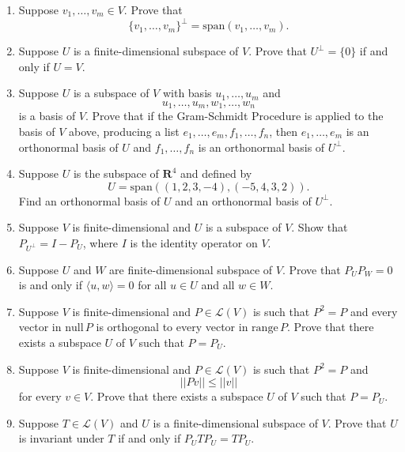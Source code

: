 \documentclass{book}
\begin{document}
\begin{enumerate}

\item Suppose \(v_1,\dots,v_m \in V\).  Prove that \[\{v_1,\dots,v_m\}^{\perp} = \textrm{span}(v_1,\dots,v_m).\]

\item Suppose \(U\) is a finite-dimensional subspace of \(V\).  Prove that \(U^{\perp}=\{0\}\) if and only if \(U=V\).

\item Suppose \(U\) is a subspace of \(V\) with basis \(u_1,\dots,u_m\) and \[u_1,\dots,u_m,w_1,\dots,w_n\] is a basis of \(V\).  Prove that if the Gram-Schmidt Procedure is applied to the basis of \(V\) above, producing a list \(e_1,\dots,e_m,f_1,\dots,f_n\), then \(e_1,\dots,e_m\) is an orthonormal basis of \(U\) and \(f_1,\dots,f_n\) is an orthonormal basis of \(U^{\perp}\).

\item Suppose \(U\) is the subspace of \(\textbf{R}^4\) and defined by \[U=\textrm{span}((1,2,3,-4),(-5,4,3,2)).\] Find an orthonormal basis of \(U\) and an orthonormal basis of \(U^{\perp}\).

\item Suppose \(V\) is finite-dimensional and \(U\) is a subspace of \(V\).  Show that \(P_{U^{\perp}}=I-P_U\), where \(I\) is the identity operator on \(V\).

\item Suppose \(U\) and \(W\) are finite-dimensional subspace of \(V\).  Prove that \(P_UP_W=0\) is and only if \(\langle u,w \rangle=0\) for all \(u \in U\) and all \(w \in W\).

\item Suppose \(V\) is finite-dimensional and \(P \in \mathcal{L}(V)\) is such that \(P^2=P\) and every vector in \(\textrm{null} \, P\) is orthogonal to every vector in \(\textrm{range} \, P\).  Prove that there exists a subspace \(U\) of \(V\) such that \(P=P_U\).

\item Suppose \(V\) is finite-dimensional and \(P \in \mathcal{L}(V)\) is such that \(P^2=P\) and \[||Pv|| \leq ||v||\] for every \(v \in V\).  Prove that there exists a subspace \(U\) of \(V\) such that \(P=P_U\).

\item Suppose \(T \in \mathcal{L}(V)\) and \(U\) is a finite-dimensional subspace of \(V\).  Prove that \(U\) is invariant under \(T\) if and only if \(P_UTP_U=TP_U\).


\end{enumerate}
\end{document}

